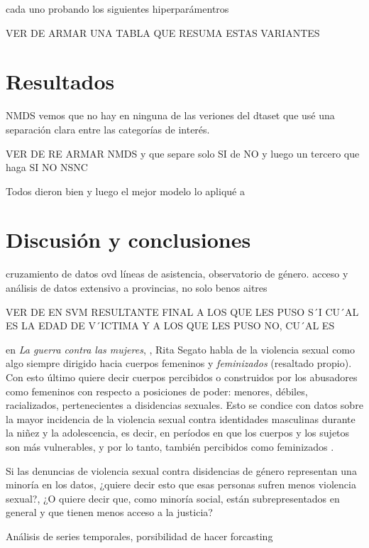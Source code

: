 \documentclass[10 pt]{article}
\begin{document}
cada uno probando los siguientes hiperparámentros

VER DE ARMAR UNA TABLA QUE RESUMA ESTAS VARIANTES 


\section*{Resultados}\label{resultados}
NMDS vemos que no hay en ninguna de las veriones del dtaset que usé una separación clara entre las categorías de interés.

VER DE RE ARMAR NMDS y que separe solo SI de NO y luego un tercero que haga SI NO NSNC

Todos dieron bien y luego el mejor modelo lo apliqué a 

\section*{Discusión y conclusiones}\label{conc}
cruzamiento de datos ovd líneas de asistencia, observatorio de género.
acceso y análisis de datos extensivo a provincias, no solo benos aitres


VER DE EN SVM RESULTANTE FINAL A LOS QUE LES PUSO S´I CU´AL ES LA EDAD DE V´ICTIMA Y A LOS QUE LES PUSO NO, CU´AL ES

en \textit{La guerra contra las mujeres}, \citeyearpar{segato2016guerra}, Rita Segato habla de la violencia sexual como algo siempre dirigido hacia cuerpos femeninos y \textit{feminizados} (resaltado propio). Con esto último quiere decir cuerpos percibidos o construidos por los abusadores como femeninos con respecto a posiciones de poder: menores, débiles, racializados, pertenecientes a disidencias sexuales. Esto se condice con datos sobre la mayor incidencia de la violencia sexual contra identidades masculinas durante la niñez y la adolescencia, es decir, en períodos en que los cuerpos y los sujetos son más vulnerables, y por lo tanto, también percibidos como feminizados \citep*{contreras2016violencia,ufem_relevamiento,ferris2002world}.

Si las denuncias de violencia sexual contra disidencias de género representan una minoría en los datos, ¿quiere decir esto que esas personas sufren menos violencia sexual?, ¿O quiere decir que, como minoría social, están subrepresentados en general y que tienen menos acceso a la justicia?



Análisis de series temporales, porsibilidad de hacer forcasting
\newpage
\end{document}
